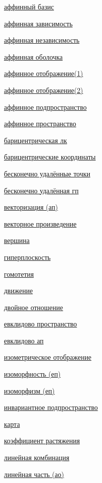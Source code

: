 \documentclass[a4paper,100pt]{article}
\theoremstyle{indented}
\theoremstyle{definition}
\theoremstyle{remark}
\begin{document}
\begin{multicols}{2}

    \hyperlink{s24}{аффинный базис} \ 

    \hyperlink{s22}{аффинная зависимость} \ 
    
    \hyperlink{s23}{аффинная независимость} \ 
    
    \hyperlink{s21}{аффинная оболочка} \ 
    
    \hyperlink{s26}{аффинное отображение(1)} \ 
    
    \hyperlink{s28}{аффинное отображение(2)} \ 
    
    \hyperlink{s13}{аффинное подпространство} \ 
    
    \hyperlink{s1}{аффинное пространство} \
    
    \hyperlink{s8}{барицентрическая лк} \
    
    \hyperlink{s25}{барицентрические координаты} \ 
    
    \hyperlink{s38}{бесконечно удалённые точки} \ 

    \hyperlink{s39}{бесконечно удалённая гп} \
    
    \hyperlink{s6}{векторизация (ап)} \ 

    \hyperlink{s83}{векторное произведение} \ 

    \hyperlink{s49}{вершина} \ 
    
    \hyperlink{s19}{гиперплоскость} \ 
    
    \hyperlink{s29}{гомотетия} \ 

    \hyperlink{s86}{движение} \ 

    \hyperlink{s41}{двойное отношение} \

    \hyperlink{s54}{евклидово пространство} \ 

    \hyperlink{s84}{евклидово ап} \ 

    \hyperlink{s72}{изометрическое отображение} \ 

    \hyperlink{s65}{изоморфность (еп)} \ 

    \hyperlink{s66}{изоморфизм (еп)} \ 

    \hyperlink{s77}{инвариантное подпространство} \ 

    \hyperlink{s40}{карта} \
    
    \hyperlink{s30}{коэффициент растяжения} \ 
    
    \hyperlink{s7}{линейная комбинация} \ 
    
    \hyperlink{s27}{линейная часть (ао)} \ 
    

\end{multicols}
\end{document}
